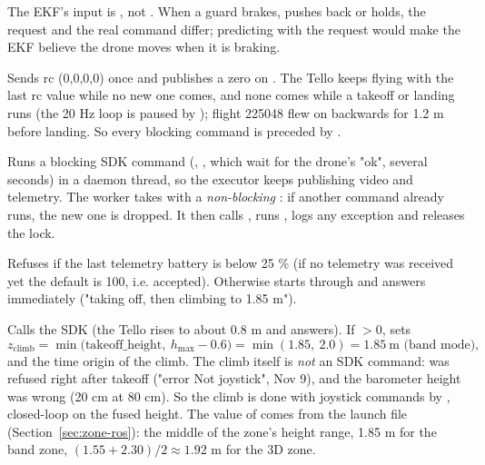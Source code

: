 \begin{keypoint}
The EKF's input is , not . When a guard brakes, pushes back or
holds, the request and the real command differ; predicting with the request would make the EKF believe the drone
moves when it is braking.
\end{keypoint}

Sends rc (0,0,0,0) once and publishes a zero  on . The Tello keeps flying with
the last rc value while no new one comes, and none comes while a takeoff or landing runs (the 20 Hz loop is
paused by ); flight 225048 flew on backwards for 1.2 m before landing. So every blocking command is
preceded by .

Runs a blocking SDK command (, , which wait for the drone's "ok", several
seconds) in a daemon thread, so the executor keeps publishing video and telemetry. The worker takes
 with a \emph{non-blocking} : if another command already runs, the new one is dropped.
It then calls , runs , logs any exception and releases the lock.

Refuses if the last telemetry battery is below 25 \% (if no telemetry was received yet the default is 100, i.e.
accepted). Otherwise starts  through  and answers immediately ("taking
off, then climbing to 1.85 m").

Calls the SDK  (the Tello rises to about 0.8 m and answers). If  $>0$, sets
$$
z_{\text{climb}} = \min\big(\text{takeoff\_height},\ h_{\max}-0.6\big) = \min(1.85,\ 2.0) = 1.85\ \text{m (band mode)},
$$
and the time origin of the climb. The climb itself is \emph{not} an SDK command:  was refused right after
takeoff ("error Not joystick", Nov 9), and the barometer height  was wrong (20 cm at 80 cm). So the climb
is done with joystick commands by , closed-loop on the fused height. The value of
 comes from the launch file (Section~\ref{sec:zone-ros}): the middle of the zone's height
range, 1.85 m for the band zone, $(1.55+2.30)/2\approx1.92$ m for the 3D zone.


